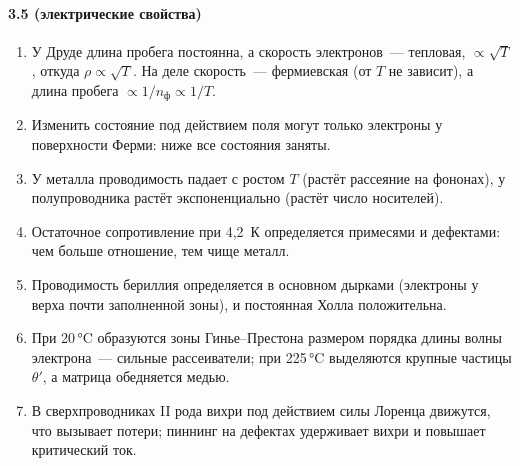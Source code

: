 {\paragraph{3.5 (электрические свойства)}
\begin{enumerate}[label=\arabic*.]
\item У Друде длина пробега постоянна, а скорость электронов~—
тепловая, $\propto\sqrt T$, откуда $\rho\propto\sqrt T$. На деле скорость~—
фермиевская (от $T$ не зависит), а длина пробега $\propto1/n_\text{ф}\propto1/T$.
\item Изменить состояние под действием поля могут только электроны у
поверхности Ферми: ниже все состояния заняты.
\item У металла проводимость падает с ростом $T$ (растёт рассеяние на
фононах), у полупроводника растёт экспоненциально (растёт число носителей).
\item Остаточное сопротивление при 4,2~К определяется примесями и
дефектами: чем больше отношение, тем чище металл.
\item Проводимость бериллия определяется в основном дырками (электроны у
верха почти заполненной зоны), и постоянная Холла положительна.
\item При 20\,°C образуются зоны Гинье--Престона размером порядка длины
волны электрона~— сильные рассеиватели; при 225\,°C выделяются крупные
частицы $\theta'$, а матрица обедняется медью.
\item В сверхпроводниках II рода вихри под действием силы Лоренца
движутся, что вызывает потери; пиннинг на дефектах удерживает вихри и
повышает критический ток.
\end{enumerate}

}
